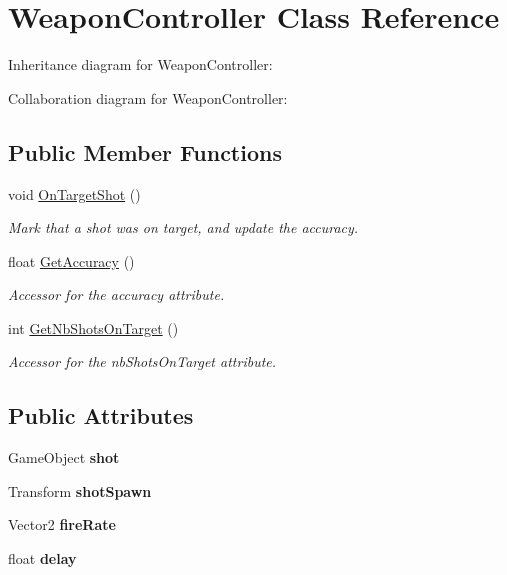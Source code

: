 \hypertarget{class_weapon_controller}{}\section{Weapon\+Controller Class Reference}
\label{class_weapon_controller}


Inheritance diagram for Weapon\+Controller\+:


Collaboration diagram for Weapon\+Controller\+:
\subsection*{Public Member Functions}
\begin{DoxyCompactItemize}
\item 
void \mbox{\hyperlink{class_weapon_controller_ab21b5173574bd1d507709b21be4aec1c}{On\+Target\+Shot}} ()
\begin{DoxyCompactList}\small\item\em Mark that a shot was on target, and update the accuracy. \end{DoxyCompactList}\item 
float \mbox{\hyperlink{class_weapon_controller_a32d07eb45dc1079a4c82bae18a57f493}{Get\+Accuracy}} ()
\begin{DoxyCompactList}\small\item\em Accessor for the accuracy attribute. \end{DoxyCompactList}\item 
int \mbox{\hyperlink{class_weapon_controller_aab88ffc7b720e10dce55b93dec090297}{Get\+Nb\+Shots\+On\+Target}} ()
\begin{DoxyCompactList}\small\item\em Accessor for the nb\+Shots\+On\+Target attribute. \end{DoxyCompactList}\end{DoxyCompactItemize}
\subsection*{Public Attributes}
\begin{DoxyCompactItemize}
\item 
\mbox{\label{class_weapon_controller_a963340c5f785bb87fdd6cf0e6d6071d5}} 
Game\+Object {\bfseries shot}
\item 
\mbox{\label{class_weapon_controller_aa8f1205518b7c00dcb636ccd9bfb7ed9}} 
Transform {\bfseries shot\+Spawn}
\item 
\mbox{\label{class_weapon_controller_a82c6c419930686076e2e67c5453e3ac9}} 
Vector2 {\bfseries fire\+Rate}
\item 
\mbox{\label{class_weapon_controller_a798adbbaf5804e4a4a4f82b4ab6c2754}} 
float {\bfseries delay}
\end{DoxyCompactItemize}


